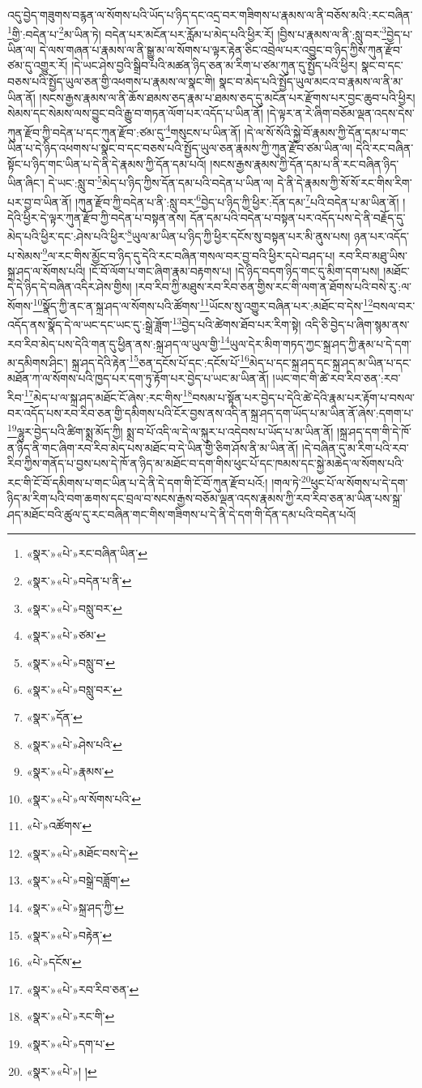འདུ་བྱེད་གཟུགས་བརྙན་ལ་སོགས་པའི་ཡོད་པ་ཉིད་དང་འདྲ་བར་གཟིགས་པ་རྣམས་ལ་ནི་བཅོས་མའི་:རང་བཞིན་\footnote{«སྣར་»«པེ་»རང་བཞིན་ཡིན་}གྱི་:བདེན་པ་\footnote{«སྣར་»«པེ་»བདེན་པ་ནི་}མ་ཡིན་ཏེ། བདེན་པར་མངོན་པར་རློམ་པ་མེད་པའི་ཕྱིར་རོ། །བྱིས་པ་རྣམས་ལ་ནི་:སླུ་བར་\footnote{«སྣར་»«པེ་»བསླུ་བར་}བྱེད་པ་ཡིན་ལ། དེ་ལས་གཞན་པ་རྣམས་ལ་ནི་སྒྱུ་མ་ལ་སོགས་པ་ལྟར་རྟེན་ཅིང་འབྲེལ་པར་འབྱུང་བ་ཉིད་ཀྱིས་ཀུན་རྫོབ་ཙམ་དུ་འགྱུར་རོ། །དེ་ཡང་ཤེས་བྱའི་སྒྲིབ་པའི་མཚན་ཉིད་ཅན་མ་རིག་པ་ཙམ་ཀུན་དུ་སྤྱོད་པའི་ཕྱིར། སྣང་བ་དང་བཅས་པའི་སྤྱོད་ཡུལ་ཅན་གྱི་འཕགས་པ་རྣམས་ལ་སྣང་གི། སྣང་བ་མེད་པའི་སྤྱོད་ཡུལ་མངའ་བ་རྣམས་ལ་ནི་མ་ཡིན་ནོ། །སངས་རྒྱས་རྣམས་ལ་ནི་ཆོས་ཐམས་ཅད་རྣམ་པ་ཐམས་ཅད་དུ་མངོན་པར་རྫོགས་པར་བྱང་ཆུབ་པའི་ཕྱིར། སེམས་དང་སེམས་ལས་བྱུང་བའི་རྒྱུ་བ་གཏན་ལོག་པར་འདོད་པ་ཡིན་ནོ། །དེ་ལྟར་ན་རེ་ཞིག་བཅོམ་ལྡན་འདས་དེས་ཀུན་རྫོབ་ཀྱི་བདེན་པ་དང་ཀུན་རྫོབ་:ཙམ་དུ་\footnote{«སྣར་»«པེ་»ཙམ་}གསུངས་པ་ཡིན་ནོ། །དེ་ལ་སོ་སོའི་སྐྱེ་བོ་རྣམས་ཀྱི་དོན་དམ་པ་གང་ཡིན་པ་དེ་ཉིད་འཕགས་པ་སྣང་བ་དང་བཅས་པའི་སྤྱོད་ཡུལ་ཅན་རྣམས་ཀྱི་ཀུན་རྫོབ་ཙམ་ཡིན་ལ། དེའི་རང་བཞིན་སྟོང་པ་ཉིད་གང་ཡིན་པ་དེ་ནི་དེ་རྣམས་ཀྱི་དོན་དམ་པའོ། །སངས་རྒྱས་རྣམས་ཀྱི་དོན་དམ་པ་ནི་རང་བཞིན་ཉིད་ཡིན་ཞིང་། དེ་ཡང་:སླུ་བ་\footnote{«སྣར་»«པེ་»བསླུ་བ་}མེད་པ་ཉིད་ཀྱིས་དོན་དམ་པའི་བདེན་པ་ཡིན་ལ། དེ་ནི་དེ་རྣམས་ཀྱི་སོ་སོ་རང་གིས་རིག་པར་བྱ་བ་ཡིན་ནོ། །ཀུན་རྫོབ་ཀྱི་བདེན་པ་ནི་:སླུ་བར་\footnote{«སྣར་»«པེ་»བསླུ་བར་}བྱེད་པ་ཉིད་ཀྱི་ཕྱིར་:དོན་དམ་\footnote{«སྣར་»དོན་}པའི་བདེན་པ་མ་ཡིན་ནོ། །དེའི་ཕྱིར་དེ་ལྟར་ཀུན་རྫོབ་ཀྱི་བདེན་པ་བསྟན་ནས། དོན་དམ་པའི་བདེན་པ་བསྟན་པར་འདོད་པས་དེ་ནི་བརྗོད་དུ་མེད་པའི་ཕྱིར་དང་:ཤེས་པའི་ཕྱིར་\footnote{«སྣར་»«པེ་»ཤེས་པའི་}ཡུལ་མ་ཡིན་པ་ཉིད་ཀྱི་ཕྱིར་དངོས་སུ་བསྟན་པར་མི་ནུས་པས། ཉན་པར་འདོད་པ་སེམས་\footnote{«སྣར་»«པེ་»རྣམས་}ལ་རང་གིས་མྱོང་བ་ཉིད་དུ་དེའི་རང་བཞིན་གསལ་བར་བྱ་བའི་ཕྱིར་དཔེ་བཤད་པ། རབ་རིབ་མཐུ་ཡིས་སྐྲ་ཤད་ལ་སོགས་པའི། །ངོ་བོ་ལོག་པ་གང་ཞིག་རྣམ་བརྟགས་པ། །དེ་ཉིད་བདག་ཉིད་གང་དུ་མིག་དག་པས། །མཐོང་དེ་དེ་ཉིད་དེ་བཞིན་འདིར་ཤེས་གྱིས། །རབ་རིབ་ཀྱི་མཐུས་རབ་རིབ་ཅན་གྱིས་རང་གི་ལག་ན་ཐོགས་པའི་བསེ་རུ་:ལ་སོགས་\footnote{«སྣར་»«པེ་»ལ་སོགས་པའི་}སྣོད་ཀྱི་ནང་ན་སྐྲ་ཤད་ལ་སོགས་པའི་ཚོགས་\footnote{«པེ་»འཚོགས་}ཡོངས་སུ་འགྱུར་བཞིན་པར་:མཐོང་བ་དེས་\footnote{«སྣར་»«པེ་»མཐོང་བས་དེ་}བསལ་བར་འདོད་ནས་སྣོད་དེ་ལ་ཡང་དང་ཡང་དུ་:སྒྲེ་ཟློག་\footnote{«སྣར་»«པེ་»བསྒྲེ་བཟློག་}བྱེད་པའི་ཚེགས་ཐོབ་པར་རིག་སྟེ། འདི་ཅི་བྱེད་པ་ཞིག་སྙམ་ནས་རབ་རིབ་མེད་པས་དེའི་གན་དུ་ཕྱིན་ནས་:སྐྲ་ཤད་ལ་ཡུལ་གྱི་\footnote{«སྣར་»«པེ་»སྐྲ་ཤད་ཀྱི་}ཡུལ་དེར་མིག་གཏད་ཀྱང་སྐྲ་ཤད་ཀྱི་རྣམ་པ་དེ་དག་མ་དམིགས་ཤིང་། སྐྲ་ཤད་དེའི་རྟེན་\footnote{«སྣར་»«པེ་»བརྟེན་}ཅན་དངོས་པོ་དང་:དངོས་པོ་\footnote{«པེ་»དངོས་}མེད་པ་དང་སྐྲ་ཤད་དང་སྐྲ་ཤད་མ་ཡིན་པ་དང་མཐོན་ཀ་ལ་སོགས་པའི་ཁྱད་པར་དག་ཏུ་རྟོག་པར་བྱེད་པ་ཡང་མ་ཡིན་ནོ། །ཡང་གང་གི་ཚེ་རབ་རིབ་ཅན་:རབ་རིབ་\footnote{«སྣར་»«པེ་»རབ་རིབ་ཅན་}མེད་པ་ལ་སྐྲ་ཤད་མཐོང་ངོ་ཞེས་:རང་གིས་\footnote{«སྣར་»«པེ་»རང་གི་}བསམ་པ་སྟོན་པར་བྱེད་པ་དེའི་ཚེ་དེའི་རྣམ་པར་རྟོག་པ་བསལ་བར་འདོད་པས་རབ་རིབ་ཅན་གྱི་དམིགས་པའི་ངོར་བྱས་ནས་འདི་ན་སྐྲ་ཤད་དག་ཡོད་པ་མ་ཡིན་ནོ་ཞེས་:དགག་པ་\footnote{«སྣར་»«པེ་»དག་པ་}ལྷུར་བྱེད་པའི་ཚིག་སྨྲ་མོད་ཀྱི། སྨྲ་བ་པོ་འདི་ལ་དེ་ལ་སྐུར་པ་འདེབས་པ་ཡོད་པ་མ་ཡིན་ནོ། །སྐྲ་ཤད་དག་གི་དེ་ཁོ་ན་ཉིད་ནི་གང་ཞིག་རབ་རིབ་མེད་པས་མཐོང་བ་དེ་ཡིན་གྱི་ཅིག་ཤོས་ནི་མ་ཡིན་ནོ། །དེ་བཞིན་དུ་མ་རིག་པའི་རབ་རིབ་ཀྱིས་གནོད་པ་བྱས་པས་དེ་ཁོ་ན་ཉིད་མ་མཐོང་བ་དག་གིས་ཕུང་པོ་དང་ཁམས་དང་སྐྱེ་མཆེད་ལ་སོགས་པའི་རང་གི་ངོ་བོ་དམིགས་པ་གང་ཡིན་པ་དེ་ནི་དེ་དག་གི་ངོ་བོ་ཀུན་རྫོབ་པའོ:། །གལ་ཏེ་\footnote{«སྣར་»«པེ་»། །}ཕུང་པོ་ལ་སོགས་པ་དེ་དག་ཉིད་མ་རིག་པའི་བག་ཆགས་དང་བྲལ་བ་སངས་རྒྱས་བཅོམ་ལྡན་འདས་རྣམས་ཀྱི་རབ་རིབ་ཅན་མ་ཡིན་པས་སྐྲ་ཤད་མཐོང་བའི་ཚུལ་དུ་རང་བཞིན་གང་གིས་གཟིགས་པ་དེ་ནི་དེ་དག་གི་དོན་དམ་པའི་བདེན་པའོ། 